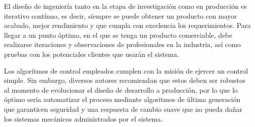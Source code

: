 El diseño de ingeniería tanto en la etapa de investigación como en producción es iterativo contínuo, es decir, siempre se puede obtener un producto con mayor acabado, mejor rendimiento y que cumpla con excelencia los requerimientos. Para llegar a un punto óptimo, en el que se tenga un producto comerciable, debe realizarse iteraciones y observaciones de profesionales en la industria, así como pruebas con los potenciales clientes que usarán el sistema.

Los algoritmos de control empleados cumplen con la misión de ejercer un control simple. Sin embargo, diversos autores recomiendan que estos deben ser robustos al momento de evolucionar el diseño de desarrollo a producción, por lo que lo óptimo sería automatizar el proceso mediante algoritmos de última generación que garanticen seguridad y una respuesta de cambio suave que no pueda dañar los sistemas mecánicos administrados por el sistema.




